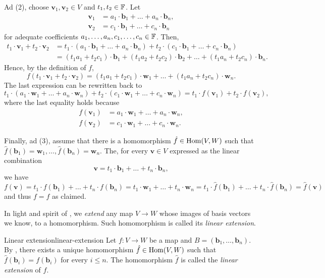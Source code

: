\begin{thmproof}
 Ad (2), choose $\mathbf{v}_1,\mathbf{v}_2 \in V$ and $t_1,t_2 \in \mathbb{F}$. Let
 \begin{align*}
  \mathbf{v}_1 &= a_1 \cdot \mathbf{b}_1 + \ldots + a_n \cdot \mathbf{b}_n,\\
  \mathbf{v}_2 &= c_1 \cdot \mathbf{b}_1 + \ldots + c_n \cdot \mathbf{b}_n
 \end{align*}
 for adequate coefficients $a_1,\ldots,a_n,c_1,\ldots,c_n \in \mathbb{F}$. Then,
 \begin{align*}
  t_1 \cdot \mathbf{v}_1 + t_2 \cdot \mathbf{v}_2 
  &= t_1 \cdot (a_1 \cdot \mathbf{b}_1 + \ldots + a_n \cdot \mathbf{b}_n) + t_2
  \cdot (c_1 \cdot \mathbf{b}_1 + \ldots + c_n \cdot \mathbf{b}_n)\\
  &=(t_1a_1 + t_2c_1) \cdot \mathbf{b}_1 + (t_1a_2 + t_2c_2) \cdot \mathbf{b}_2
  + \ldots + (t_1a_n + t_2c_n) \cdot \mathbf{b}_n.
 \end{align*}
 Hence, by the definition of $f$,
 \[
  f(t_1 \cdot \mathbf{v}_1 + t_2 \cdot \mathbf{v}_2) = (t_1a_1 + t_2c_1) \cdot
  \mathbf{w}_1 + \ldots + (t_1a_n + t_2c_n) \cdot \mathbf{w}_n.
 \]
 The last expression can be rewritten back to
 \[
  t_1 \cdot (a_1 \cdot \mathbf{w}_1 + \ldots + a_n \cdot \mathbf{w}_n) + t_2
  \cdot (c_1 \cdot \mathbf{w}_1 + \ldots + c_n \cdot \mathbf{w}_n) = t_1 \cdot
  f(\mathbf{v}_1) + t_2 \cdot f(\mathbf{v}_2),
 \]
 where the last equality holds because
 \begin{align*}
  f(\mathbf{v}_1) &= a_1 \cdot \mathbf{w}_1 + \ldots + a_n \cdot \mathbf{w}_n,\\
  f(\mathbf{v}_2) &= c_1 \cdot \mathbf{w}_1 + \ldots + c_n \cdot \mathbf{w}_n.
 \end{align*}

 Finally, ad (3), assume that there is a homomorphism $\hat{f} \in \operatorname{Hom}(V,W)$
 such that $\hat{f}(\mathbf{b}_1) = \mathbf{w}_1, \ldots, \hat{f}(\mathbf{b}_n)
 = \mathbf{w}_n$. The, for every $\mathbf{v} \in V$ expressed as the linear
 combination
 \[
  \mathbf{v} = t_1 \cdot \mathbf{b}_1 + \ldots + t_n \cdot \mathbf{b}_n,
 \]
 we have
 \[
  f(\mathbf{v}) = t_1 \cdot f(\mathbf{b}_1) + \ldots + t_n \cdot f(\mathbf{b}_n)
  = t_1 \cdot \mathbf{w}_1 + \ldots + t_n \cdot \mathbf{w}_n = t_1 \cdot
  \hat{f}(\mathbf{b}_1) + \ldots + t_n \cdot \hat{f}(\mathbf{b}_n) =
  \hat{f}(\mathbf{v})
 \]
 and thus $f = \hat{f}$ as claimed.
\end{thmproof}

In light and spirit of , we \emph{extend} any
map $V \to W$ whose images of basis vectors we know, to a homomorphism. Such
homomorphism is called its \emph{linear extension}.

\begin{definition}{Linear extension}{linear-extension}
 Let $f:V \to W$ be a map and $B = (\mathbf{b}_1,\ldots,\mathbf{b}_n)$. By
 , there exists a unique homomorphism
 $\hat{f} \in \operatorname{Hom}(V,W)$ such that $\hat{f}(\mathbf{b}_i) = f(\mathbf{b}_i)$ for
 every $i \leq n$. The homomorphism $\hat{f}$ is called the \emph{linear
 extension} of $f$.
\end{definition}



